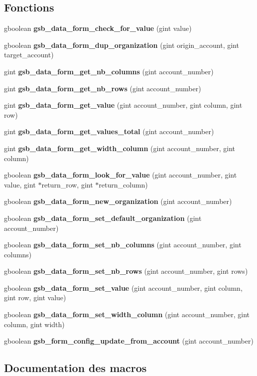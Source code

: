 \subsection*{Fonctions}
\begin{DoxyCompactItemize}
\item 
gboolean {\bf gsb\_\-data\_\-form\_\-check\_\-for\_\-value} (gint value)
\item 
gboolean {\bf gsb\_\-data\_\-form\_\-dup\_\-organization} (gint origin\_\-account, gint target\_\-account)
\item 
gint {\bf gsb\_\-data\_\-form\_\-get\_\-nb\_\-columns} (gint account\_\-number)
\item 
gint {\bf gsb\_\-data\_\-form\_\-get\_\-nb\_\-rows} (gint account\_\-number)
\item 
gint {\bf gsb\_\-data\_\-form\_\-get\_\-value} (gint account\_\-number, gint column, gint row)
\item 
gint {\bf gsb\_\-data\_\-form\_\-get\_\-values\_\-total} (gint account\_\-number)
\item 
gint {\bf gsb\_\-data\_\-form\_\-get\_\-width\_\-column} (gint account\_\-number, gint column)
\item 
gboolean {\bf gsb\_\-data\_\-form\_\-look\_\-for\_\-value} (gint account\_\-number, gint value, gint $\ast$return\_\-row, gint $\ast$return\_\-column)
\item 
gboolean {\bf gsb\_\-data\_\-form\_\-new\_\-organization} (gint account\_\-number)
\item 
gboolean {\bf gsb\_\-data\_\-form\_\-set\_\-default\_\-organization} (gint account\_\-number)
\item 
gboolean {\bf gsb\_\-data\_\-form\_\-set\_\-nb\_\-columns} (gint account\_\-number, gint columns)
\item 
gboolean {\bf gsb\_\-data\_\-form\_\-set\_\-nb\_\-rows} (gint account\_\-number, gint rows)
\item 
gboolean {\bf gsb\_\-data\_\-form\_\-set\_\-value} (gint account\_\-number, gint column, gint row, gint value)
\item 
gboolean {\bf gsb\_\-data\_\-form\_\-set\_\-width\_\-column} (gint account\_\-number, gint column, gint width)
\item 
gboolean {\bf gsb\_\-form\_\-config\_\-update\_\-from\_\-account} (gint account\_\-number)
\end{DoxyCompactItemize}


\subsection{Documentation des macros}
